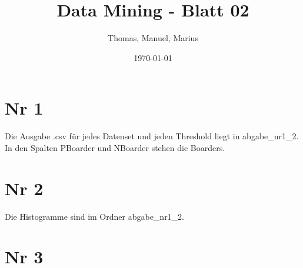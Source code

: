 \documentclass{article}
\title{Data Mining - Blatt 02}
\author{Thomas, Manuel, Marius}
\date{\today}
\begin{document}
\maketitle

\section{Nr 1}
Die Ausgabe .csv für jedes Datenset und jeden Threshold liegt in abgabe\_nr1\_2. In den Spalten PBoarder und NBoarder
stehen die Boarders.

\section{Nr 2}
Die Histogramme sind im Ordner abgabe\_nr1\_2.

\section{Nr 3}
\end{document}
